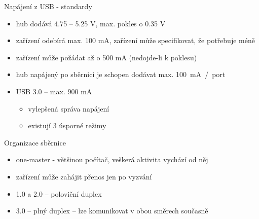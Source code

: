 \documentclass[aspectratio=43]{beamer}
\begin{document}
\begin{frame}{Napájení z USB - standardy}
	\begin{itemize}
		\item hub dodává 4.75 – 5.25 V, max. pokles o 0.35 V
		\item zařízení odebírá max. 100 mA, zařízení může specifikovat, že potřebuje méně
		\item zařízení může požádat až o 500 mA (nedojde-li k poklesu)
		\item hub napájený po sběrnici je schopen dodávat max. 100~mA~/~port
		\item USB 3.0 – max. 900 mA
		      \begin{itemize}
		      	\item vylepšená správa napájení
		      	\item existují 3 úsporné režimy
		      \end{itemize}
	\end{itemize}
\end{frame}


\begin{frame}{Organizace sběrnice}
	\begin{itemize}
		\item one-master - většinou počítač, veškerá aktivita vychází od něj
		\item zařízení může zahájit přenos jen po vyzvání
		\item 1.0 a 2.0 – poloviční duplex
		\item 3.0 – plný duplex – lze komunikovat v obou směrech současně
	\end{itemize}
\end{frame}
\end{document}
